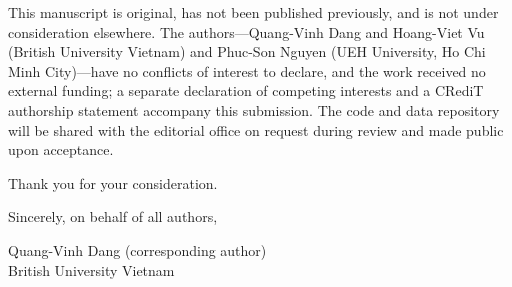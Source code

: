 \documentclass[11pt]{article}
\begin{document}
This manuscript is original, has not been published previously, and is
not under consideration elsewhere. The authors---Quang-Vinh Dang and
Hoang-Viet Vu (British University Vietnam) and Phuc-Son Nguyen (UEH
University, Ho Chi Minh City)---have no conflicts of interest to
declare, and the work received no external funding; a separate
declaration of competing interests and a CRediT authorship statement
accompany this submission. The code and data repository will be shared
with the editorial office on request during review and made public
upon acceptance.

Thank you for your consideration.

\vspace{14pt}
\noindent Sincerely, on behalf of all authors,

\vspace{6pt}
\noindent Quang-Vinh Dang (corresponding author)\\
British University Vietnam
\end{document}

